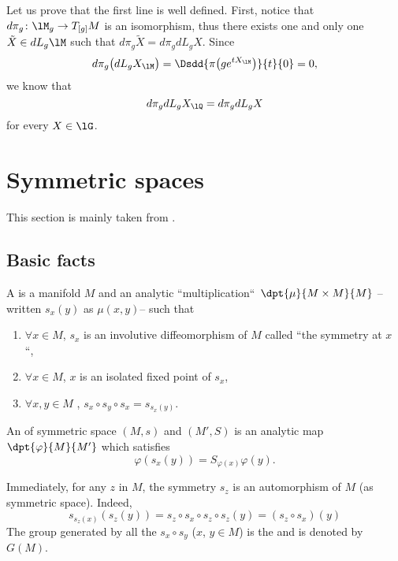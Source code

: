 Let us prove that the first line is well defined. First, notice that $d\pi_g\colon \lM_g\to T_{[g]}M$ is an isomorphism, thus there exists one and only one $\tilde X\in dL_g\lM$ such that $d\pi_g \tilde X=d\pi_gdL_g X$. Since
\begin{equation}
	d\pi_g\big( dL_g X_{\lM} \big)=\Dsdd{ \pi\big( g e^{tX_{\lM}} \big) }{t}{0}=0,
\end{equation}
we know that
\begin{equation}
	d\pi_gdL_g X_{\lQ}=d\pi_gdL_g X
\end{equation}
for every $X\in \lG$.

\section{Symmetric spaces}\label{sec:symm}
This section is mainly taken from \cite{Loos,Dixmier,SSSSS,Dieu2}.

\subsection{Basic facts}

\begin{definition}
A  is a manifold $M$ and an analytic ``multiplication``\ $\dpt{\mu}{M\times M}{M}$ --written $s_x(y)$ as $\mu(x,y)$-- such that

\begin{enumerate}
\item $\forall x\in M$, $s_x$ is an involutive diffeomorphism of $M$ called ``the symmetry at $x$ ``,

\item $\forall x\in M$, $x$ is an isolated fixed point of $s_x$,
\item $\forall x,y\in M$ , $s_x\circ s_y\circ s_x=s_{s_x(y)}$.
\end{enumerate}
\label{def:esp_sym}
\end{definition}
\begin{definition}
An  of symmetric space $(M,s)$ and $(M',S)$ is an analytic map $\dpt{\varphi}{M}{M'}$ which satisfies
\[
    \varphi( s_x(y) )=S_{\varphi(x)}\varphi(y).
\]
\end{definition}

Immediately, for any $z$ in $M$, the symmetry $s_z$ is an automorphism of $M$ (as symmetric space). Indeed,
\begin{equation}
  s_{s_z(x)}(s_z(y))=s_z\circ s_x\circ s_z\circ s_z(y)
                    =(s_z\circ s_x)(y)
\end{equation}
The group generated by all the $s_x\circ s_y$ ($x$, $y\in M$) is the  and is denoted by $G(M)$.

